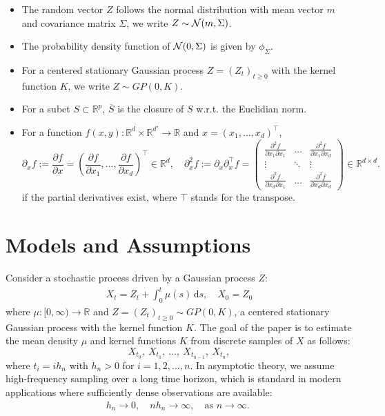 \documentclass[a4paper,10pt,twoside]{article}
\numberwithin{equation}{section}
\def\R{\mathbb{R}}
\def\l{\left}
\def\r{\right}
\def\p{\partial}
\def\ol#1{\overline{#1}}
\def\df{\mathrm{d}}
\begin{document}
\begin{itemize}
\item The random vector $Z$ follows the normal distribution with mean vector $m$ and covariance matrix $\Sigma$, we write $Z\sim {\cal N}(m,\Sigma)$. 
\item The probability density function of ${\cal N}(0,\Sigma)$ is given by $\phi_{\Sigma}$. 
\item For a centered stationary Gaussian process $Z=(Z_t)_{t\ge 0}$ with the kernel function $K$, we write $Z\sim GP(0,K)$.  
\item For a subet $S\subset \R^p$, $\ol{S}$ is the closure of $S$ w.r.t. the Euclidian norm. 
\item For a function $f(x,y): \R^{d}\times \R^{d'}\to \R$ and $x=(x_1,\dots,x_d)^\top$, 
\[
\p_x f := \frac{\p f}{\p x} = \l(\frac{\p f}{\p x_1},\dots,\frac{\p f}{\p x_d}\r)^\top \in \R^{d},\quad 
\p_x^2 f := \p_x \p_x^\top f = 
\begin{pmatrix}
\frac{\p^2 f}{\p x_1\p x_1} &\dots& \frac{\p^2 f}{\p x_1 \p x_d} \\
\vdots & \ddots & \vdots \\
\frac{\p^2 f}{\p x_d\p x_1} &\dots& \frac{\p^2 f}{\p x_d \p x_d}
\end{pmatrix} \in \R^{d\times d}. 
\]
if the partial derivatives exist, where $\top$ stands for the transpose. 

\end{itemize}


\section{Models and Assumptions}\label{sec:models}

Consider a stochastic process driven by a Gaussian process $Z$:
\begin{align}
X_t = Z_t + \int_0^t \mu(s)\,\df s,\quad  X_0 = Z_0\label{model}
\end{align}
where $\mu: [0,\infty) \to \R$ and $Z=(Z_t)_{t\ge 0}\sim GP(0,K)$, a centered stationary Gaussian process with the kernel function $K$. 
The goal of the paper is to estimate the mean density $\mu$ and kernel functions $K$  from discrete samples of $X$ as follows:  
\[
X_{t_0},\ X_{t_1},\  \dots,\  X_{t_{n-1}},\  X_{t_n}, 
\]
where $t_i = i h_n$ with $h_n > 0$ for $i=1,2,\dots,n$. In asymptotic theory, we assume high-frequency sampling over a long time horizon, which is standard in modern applications where sufficiently dense observations are available: 
\begin{align}
h_n\to 0,\quad nh_n\to \infty,\quad \mbox{as $n\to \infty$. } \label{sampling}
\end{align}
\end{document}
